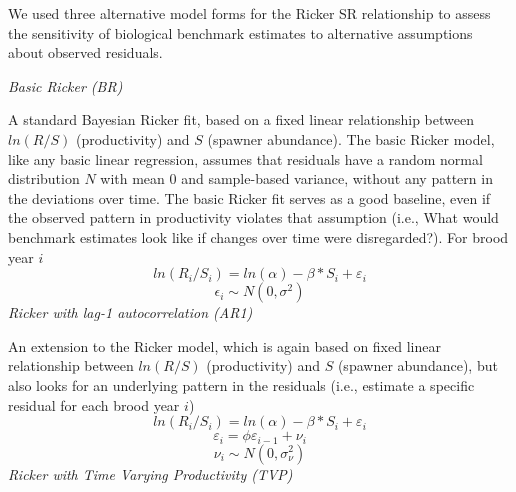 \documentclass[french,11pt]{book}
\begin{document}
We used three alternative model forms for the Ricker SR relationship to assess the sensitivity of biological benchmark estimates to alternative assumptions about observed residuals.

\emph{Basic Ricker (BR)}

A standard Bayesian Ricker fit, based on a fixed linear relationship between \(ln(R/S)\) (productivity) and \(S\) (spawner abundance). The basic Ricker model, like any basic linear regression, assumes that residuals have a random normal distribution \(N\) with mean 0 and sample-based variance, without any pattern in the deviations over time. The basic Ricker fit serves as a good baseline, even if the observed pattern in productivity violates that assumption (i.e., What would benchmark estimates look like if changes over time were disregarded?). For brood year \(i\)
\begin{equation} 
  ln(R_{i}/S_{i}) = ln(\alpha) - \beta * S_{i} + \varepsilon_{i}
  \label{eq:BasicRicker}
\end{equation}
\begin{equation} 
  \epsilon_i \sim N(0,\sigma^2)
  \label{eq:BasicRickerResid}
\end{equation}
\emph{Ricker with lag-1 autocorrelation (AR1)}

An extension to the Ricker model, which is again based on fixed linear relationship between \(ln(R/S)\) (productivity) and \(S\) (spawner abundance), but also looks for an underlying pattern in the residuals (i.e., estimate a specific residual for each brood year \(i\))
\begin{equation} 
  ln(R_{i}/S_{i}) = ln(\alpha) - \beta * S_{i} + \varepsilon_{i}
  \label{eq:AR1Ricker}
\end{equation}
\begin{equation} 
  \varepsilon_i = \phi \varepsilon_{i-1} + \nu_i
  \label{eq:AR1RickerResid1}
\end{equation}
\begin{equation} 
  \nu_i \sim N(0,\sigma_{\nu}^2)
  \label{eq:AR1RickerResid2}
\end{equation}
\emph{Ricker with Time Varying Productivity (TVP)}
\end{document}
